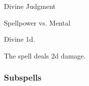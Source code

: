 \newpage
\begin{spellsection}{Divine Judgment}

\begin{spellheader}
\end{spellheader}

\begin{spellcontent}

\begin{spelltargetinginfo}




\end{spelltargetinginfo}


\begin{spelleffects}




\begin{spellattack}{Spellpower vs. Mental}


\spellsuccess Divine  \plus1d.


\end{spellattack}



\end{spelleffects}

\end{spellcontent}
\begin{spellfooter}


\end{spellfooter}
\begin{spellsubcontent}


\begin{spellcantrip}
The spell deals \minus2d damage.
\end{spellcantrip}


\end{spellsubcontent}
\end{spellsection}


\subsubsection{Subspells}





